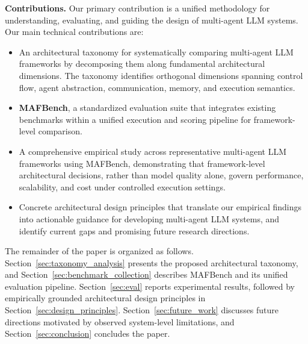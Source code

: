 \noindent\textbf{Contributions.}
Our primary contribution is a unified methodology for understanding, evaluating, and guiding the design of multi-agent LLM systems. Our main technical contributions are:

\begin{itemize}[leftmargin=4mm]
\item An architectural taxonomy for systematically comparing multi-agent LLM frameworks by decomposing them along fundamental architectural dimensions. The taxonomy identifies orthogonal dimensions spanning control flow, agent abstraction, communication, memory, and execution semantics.\shorten

\item \textbf{MAFBench}, a standardized evaluation suite that integrates existing benchmarks within a unified execution and scoring pipeline for framework-level comparison.

\item A comprehensive empirical study across representative multi-agent LLM frameworks using MAFBench, demonstrating that framework-level architectural decisions, rather than model quality alone, govern performance, scalability, and cost under controlled execution settings.

\item Concrete architectural design principles that translate our empirical findings into actionable guidance for developing multi-agent LLM systems, and identify current gaps and promising future research directions.
\end{itemize}




The remainder of the paper is organized as follows. Section~\ref{sec:taxonomy_analysis} presents the proposed architectural taxonomy, and Section~\ref{sec:benchmark_collection} describes MAFBench and its unified evaluation pipeline. Section~\ref{sec:eval} reports experimental results, followed by empirically grounded architectural design principles in Section~\ref{sec:design_principles}. Section~\ref{sec:future_work} discusses future directions motivated by observed system-level limitations, and Section~\ref{sec:conclusion} concludes the paper.
